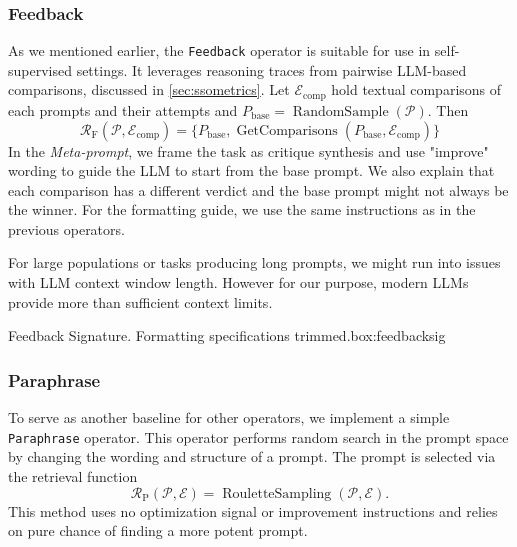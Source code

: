 \subsubsection{Feedback}
As we mentioned earlier, the \texttt{Feedback} operator is suitable for use in self-supervised settings.
It leverages reasoning traces from pairwise LLM-based comparisons, discussed in \ref{sec:ssometrics}. 
Let $\mathcal{E}_{\text{comp}}$ hold textual comparisons of each prompts and their attempts and
$P_{\text{base}} = \operatorname{RandomSample}(\mathcal{P})$. Then
\begin{equation}
    \mathcal{R}_{\text{F}}(\mathcal{P}, \mathcal{E}_{\text{comp}}) = \{P_{\text{base}}, \operatorname{GetComparisons}(P_{\text{base}}, \mathcal{E}_{\text{comp}})\}
\end{equation}
In the \textit{Meta-prompt}, we frame the task as critique synthesis and use "improve" wording to guide the LLM to start from the base prompt.
We also explain that each comparison has a different verdict and the base prompt might not always be the winner. For the formatting guide, we use the same instructions
as in the previous operators.

For large populations or tasks producing long prompts, we might run into issues with LLM context window length. 
However for our purpose, modern LLMs provide more than sufficient context limits. 
\begin{figurebox}{Feedback Signature. Formatting specifications trimmed.}{box:feedbacksig}
\end{figurebox}

\subsubsection{Paraphrase}
To serve as another baseline for other operators, we implement a simple \texttt{Paraphrase} operator.
This operator performs random search in the prompt space by changing the wording and structure of a prompt.
The prompt is selected via the retrieval function
\begin{equation}
    \mathcal{R}_{\text{P}}(\mathcal{P}, \mathcal{E}) = \operatorname{RouletteSampling}(\mathcal{P}, \mathcal{E}).
\end{equation}
This method uses no optimization signal or improvement instructions and relies on pure chance of finding a more potent prompt.


